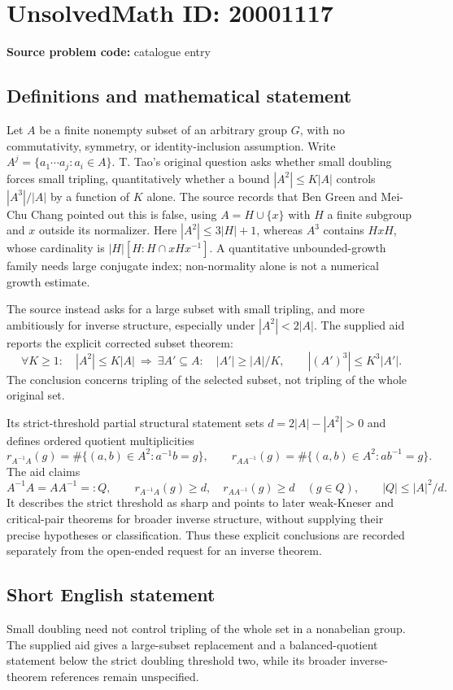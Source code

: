 \documentclass[11pt]{article}
\begin{document}
\section*{UnsolvedMath ID: 20001117}
\textbf{Source problem code:} catalogue entry
\subsection{Definitions and mathematical statement}
Let $A$ be a finite nonempty subset of an arbitrary group $G$, with no commutativity, symmetry, or identity-inclusion assumption. Write $A^j=\{a_1\cdots a_j:a_i\in A\}$. T. Tao's original question asks whether small doubling forces small tripling, quantitatively whether a bound $|A^2|\leq K|A|$ controls $|A^3|/|A|$ by a function of $K$ alone. The source records that Ben Green and Mei-Chu Chang pointed out this is false, using $A=H\cup\{x\}$ with $H$ a finite subgroup and $x$ outside its normalizer. Here $|A^2|\leq3|H|+1$, whereas $A^3$ contains $HxH$, whose cardinality is $|H|[H:H\cap xHx^{-1}]$. A quantitative unbounded-growth family needs large conjugate index; non-normality alone is not a numerical growth estimate.

The source instead asks for a large subset with small tripling, and more ambitiously for inverse structure, especially under $|A^2|<2|A|$. The supplied aid reports the explicit corrected subset theorem:
\[
 \forall K\geq1:\quad |A^2|\leq K|A|
 \ \Longrightarrow\ \exists A'\subseteq A:\quad
 |A'|\geq |A|/K,\qquad |(A')^3|\leq K^3|A'|.
\]
The conclusion concerns tripling of the selected subset, not tripling of the whole original set.

Its strict-threshold partial structural statement sets $d=2|A|-|A^2|>0$ and defines ordered quotient multiplicities
\[
 r_{A^{-1}A}(g)=\#\{(a,b)\in A^2:a^{-1}b=g\},\qquad
 r_{AA^{-1}}(g)=\#\{(a,b)\in A^2:ab^{-1}=g\}.
\]
The aid claims
\[
 A^{-1}A=AA^{-1}=:Q,\qquad
 r_{A^{-1}A}(g)\geq d,\quad r_{AA^{-1}}(g)\geq d\quad(g\in Q),\qquad
 |Q|\leq |A|^2/d.
\]
It describes the strict threshold as sharp and points to later weak-Kneser and critical-pair theorems for broader inverse structure, without supplying their precise hypotheses or classification. Thus these explicit conclusions are recorded separately from the open-ended request for an inverse theorem.
\subsection{Short English statement}
Small doubling need not control tripling of the whole set in a nonabelian group. The supplied aid gives a large-subset replacement and a balanced-quotient statement below the strict doubling threshold two, while its broader inverse-theorem references remain unspecified.
\end{document}
